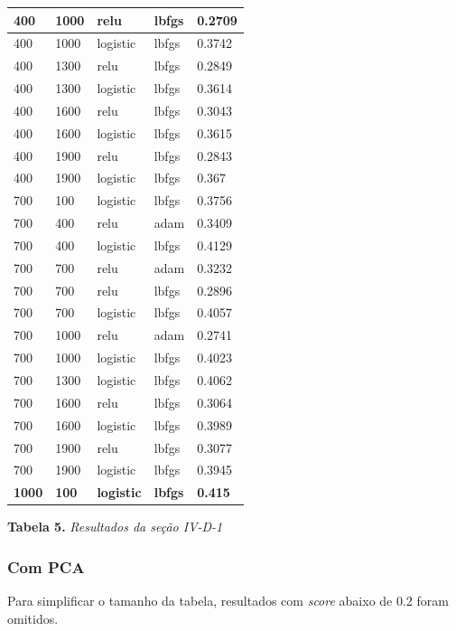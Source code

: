 \documentclass[conference]{IEEEtran}
\begin{document}
\begin{center}
\begin{tabular}{| l | l | l | l | l |}
400     & 1000    & relu     & lbfgs  & 0.2709 \\ \hline
400     & 1000    & logistic & lbfgs  & 0.3742 \\ \hline
400     & 1300    & relu     & lbfgs  & 0.2849 \\ \hline
400     & 1300    & logistic & lbfgs  & 0.3614 \\ \hline
400     & 1600    & relu     & lbfgs  & 0.3043 \\ \hline
400     & 1600    & logistic & lbfgs  & 0.3615 \\ \hline
400     & 1900    & relu     & lbfgs  & 0.2843 \\ \hline
400     & 1900    & logistic & lbfgs  & 0.367  \\ \hline
700     & 100     & logistic & lbfgs  & 0.3756 \\  \hline
700     & 400     & relu     & adam   & 0.3409 \\  \hline
700     & 400     & logistic & lbfgs  & 0.4129 \\ \hline
700     & 700     & relu     & adam   & 0.3232 \\ \hline
700     & 700     & relu     & lbfgs  & 0.2896 \\ \hline
700     & 700     & logistic & lbfgs  & 0.4057 \\ \hline
700     & 1000    & relu     & adam   & 0.2741 \\ \hline
700     & 1000    & logistic & lbfgs  & 0.4023 \\ \hline
700     & 1300    & logistic & lbfgs  & 0.4062 \\ \hline
700     & 1600    & relu     & lbfgs  & 0.3064 \\ \hline
700     & 1600    & logistic & lbfgs  & 0.3989 \\ \hline
700     & 1900    & relu     & lbfgs  & 0.3077 \\ \hline
700     & 1900    & logistic & lbfgs  & 0.3945 \\ \hline
\textbf{1000}    & \textbf{100}     & \textbf{logistic} & \textbf{lbfgs}  & \textbf{0.415}   \\  \hline
\end{tabular}
\newline
\newline
\textbf{Tabela 5.} \textit{Resultados da seção IV-D-1}
\end{center}

\subsubsection{Com PCA}
Para simplificar o tamanho da tabela, resultados com \textit{score} abaixo de 0.2 foram omitidos.
\end{document}
